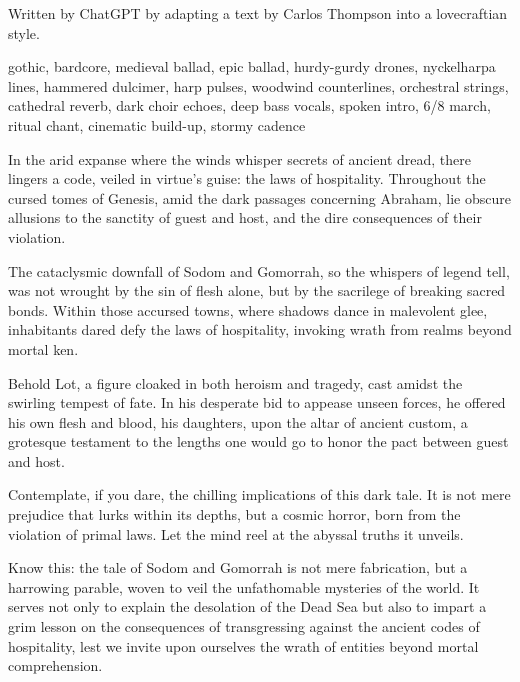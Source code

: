 
\label{sec:laws-of-hospitality}
\begin{notes}
Written by ChatGPT by adapting a text by Carlos Thompson into a lovecraftian style.
\end{notes}
\begin{style}
gothic, bardcore, medieval ballad, epic ballad, hurdy-gurdy drones, nyckelharpa lines, hammered dulcimer, harp pulses, woodwind counterlines, orchestral strings, cathedral reverb, dark choir echoes, deep bass vocals, spoken intro, 6/8 march, ritual chant, cinematic build-up, stormy cadence
\end{style}
\begin{lyrics}
In the arid expanse where the winds whisper secrets of ancient dread, there lingers a code, veiled in virtue's guise: the laws of hospitality. Throughout the cursed tomes of Genesis, amid the dark passages concerning Abraham, lie obscure allusions to the sanctity of guest and host, and the dire consequences of their violation.

The cataclysmic downfall of Sodom and Gomorrah, so the whispers of legend tell, was not wrought by the sin of flesh alone, but by the sacrilege of breaking sacred bonds. Within those accursed towns, where shadows dance in malevolent glee, inhabitants dared defy the laws of hospitality, invoking wrath from realms beyond mortal ken.

Behold Lot, a figure cloaked in both heroism and tragedy, cast amidst the swirling tempest of fate. In his desperate bid to appease unseen forces, he offered his own flesh and blood, his daughters, upon the altar of ancient custom, a grotesque testament to the lengths one would go to honor the pact between guest and host.

Contemplate, if you dare, the chilling implications of this dark tale. It is not mere prejudice that lurks within its depths, but a cosmic horror, born from the violation of primal laws. Let the mind reel at the abyssal truths it unveils.

Know this: the tale of Sodom and Gomorrah is not mere fabrication, but a harrowing parable, woven to veil the unfathomable mysteries of the world. It serves not only to explain the desolation of the Dead Sea but also to impart a grim lesson on the consequences of transgressing against the ancient codes of hospitality, lest we invite upon ourselves the wrath of entities beyond mortal comprehension.
\end{lyrics}

